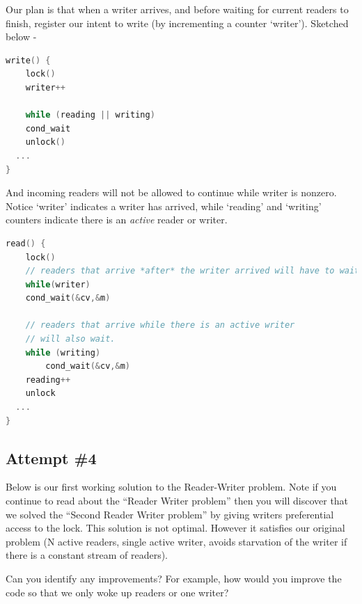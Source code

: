 Our plan is that when a writer arrives, and before waiting for current readers to finish, register our intent to write (by incrementing a counter `writer'). Sketched below -

\begin{lstlisting}[language=C]
write() {
    lock()
    writer++

    while (reading || writing)
    cond_wait
    unlock()
  ...
}
\end{lstlisting}

And incoming readers will not be allowed to continue while writer is nonzero. Notice `writer' indicates a writer has arrived, while `reading' and `writing' counters indicate there is an \emph{active} reader or writer.

\begin{lstlisting}[language=C]
read() {
    lock()
    // readers that arrive *after* the writer arrived will have to wait here!
    while(writer)
    cond_wait(&cv,&m)

    // readers that arrive while there is an active writer
    // will also wait.
    while (writing) 
        cond_wait(&cv,&m)
    reading++
    unlock
  ...
}
\end{lstlisting}

\subsection{Attempt \#4}\label{attempt-4}

Below is our first working solution to the Reader-Writer problem. Note if you continue to read about the ``Reader Writer problem'' then you will discover that we solved the ``Second Reader Writer problem'' by giving writers preferential access to the lock. This solution is not optimal. However it satisfies our original problem (N active readers, single active writer, avoids starvation of the writer if there is a constant stream of readers).

Can you identify any improvements? For example, how would you improve the code so that we only woke up readers or one writer?

